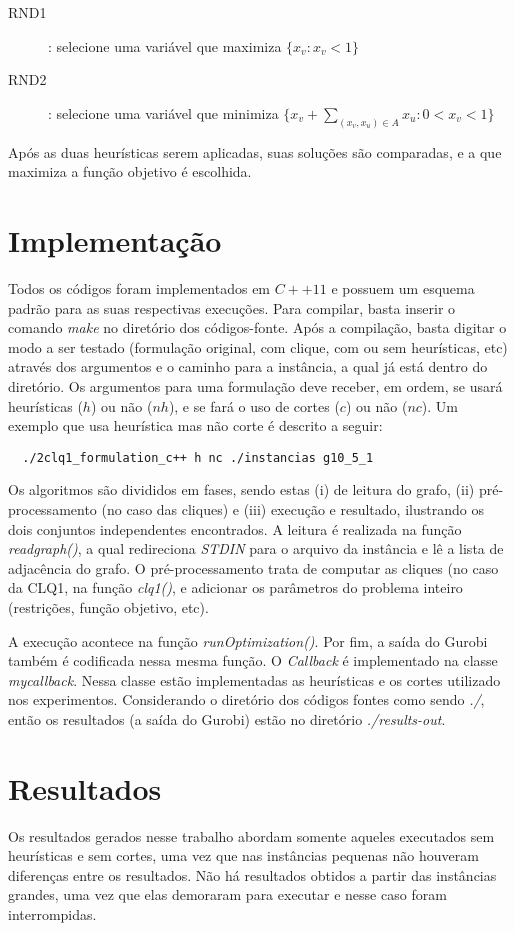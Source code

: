 \documentclass[12pt]{article}
\begin{document}
\begin{description}
\item[RND1]: selecione uma variável que maximiza $\{x_v : x_v < 1\}$
\item[RND2]: selecione uma variável que minimiza $\{x_v + \sum\limits_{(x_v, x_u) \in A}x_u : 0 < x_v < 1\}$
\end{description}

Após as duas heurísticas serem aplicadas, suas soluções são comparadas, e a que maximiza a função objetivo é escolhida.

\section{Implementação}

Todos os códigos foram implementados em $C++11$ e possuem um esquema padrão para as suas respectivas execuções. Para compilar, basta inserir o comando \textsl{make} no diretório dos códigos-fonte. Após a compilação, basta digitar o modo a ser testado (formulação original, com clique, com ou sem heurísticas, etc) através dos argumentos e o caminho para a instância, a qual já está dentro do diretório. Os argumentos para uma formulação deve receber, em ordem, se usará heurísticas ($h$) ou não ($nh$), e se fará o uso de cortes ($c$) ou não ($nc$). Um exemplo que usa heurística mas não corte é descrito a seguir:

\begin{verbatim}
  ./2clq1_formulation_c++ h nc ./instancias g10_5_1
\end{verbatim}

Os algoritmos são divididos em fases, sendo estas (i) de leitura do grafo, (ii) pré-processamento (no caso das cliques) e (iii) execução e resultado, ilustrando os dois conjuntos independentes encontrados. A leitura é realizada na função \textsl{readgraph()}, a qual redireciona \textsl{STDIN} para o arquivo da instância e lê a lista de adjacência do grafo. O pré-processamento trata de computar as cliques (no caso da CLQ1, na função \textsl{clq1()}, e adicionar os parâmetros do problema inteiro (restrições, função objetivo, etc).

A execução acontece na função \textsl{runOptimization()}. Por fim, a saída do Gurobi também é codificada nessa mesma função. O \textit{Callback} é implementado na classe \textsl{mycallback}. Nessa classe estão implementadas as heurísticas e os cortes utilizado nos experimentos. Considerando o diretório dos códigos fontes como sendo \textsl{./}, então os resultados (a saída do Gurobi) estão no diretório \textsl{./results-out}.

\section{Resultados}

Os resultados gerados nesse trabalho abordam somente aqueles executados sem heurísticas e sem cortes, uma vez que nas instâncias pequenas não houveram diferenças entre os resultados. Não há resultados obtidos a partir das instâncias grandes, uma vez que elas demoraram para executar e nesse caso foram interrompidas.
\end{document}
